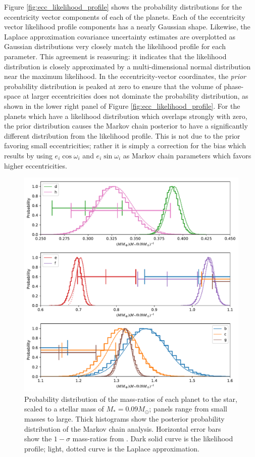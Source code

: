 \documentclass[fleqn,usenatbib]{mnras} %
\begin{document}
Figure \ref{fig:ecc_likelihood_profile} shows the probability distributions
for the eccentricity vector components of each of the planets.
Each of the eccentricity vector likelihood profile components 
has a nearly Gaussian
shape.  Likewise, the Laplace approximation covariance uncertainty estimates are overplotted as
Gaussian distributions very closely match the likelihood profile
for each parameter.  This agreement is reassuring:  it indicates
that the likelihood distribution is closely approximated by
a multi-dimensional normal distribution near the maximum likelihood.   
In the eccentricity-vector coordinates,
the {\it prior} probability distribution is peaked
at zero to ensure that the volume of phase-space at larger
eccentricities does not dominate the probability distribution,
as shown in the lower right panel of Figure \ref{fig:ecc_likelihood_profile}.  
For the planets which have
a likelihood distribution which overlaps strongly with zero,
the prior distribution causes the Markov chain posterior to
have a significantly different distribution from the likelihood profile.  This is not
due to the prior favoring small eccentricities;  rather it is simply
a correction for the bias which results by using $e_i\cos{\omega_i}$
and $e_i\sin{\omega_i}$ as Markov chain parameters which favors
higher eccentricities. 

\begin{figure}
    \centering
    \includegraphics[width=\hsize]{figures/T1_masses_03312020.pdf}
    \caption{Probability distribution of the mass-ratios of each planet to the star, scaled to a stellar mass of $M_*  = 0.09 M_\odot$; panels range from small masses to large.   Thick
    histograms show the posterior probability distribution of the Markov chain analysis.
    Horizontal error bars show the $1-\sigma$ mass-ratios from \citet{Grimm2018}.
    Dark solid curve is the likelihood profile; light, dotted curve is the Laplace approximation.}
    \label{fig:mass_likelihood_profile}
\end{figure}
\end{document}
